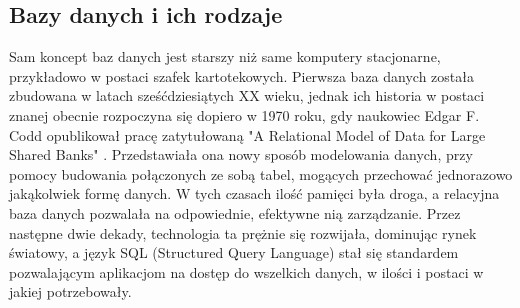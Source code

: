 \documentclass[12pt, a4paper]{article}
\begin{document}
\begin{sloppypar}
{  \subsection{Bazy danych i ich rodzaje}
  {
    Sam koncept baz danych jest starszy niż same komputery stacjonarne, przykładowo w
    postaci szafek kartotekowych. Pierwsza baza danych została zbudowana w latach
    sześćdziesiątych XX wieku,
    jednak ich historia w postaci znanej obecnie rozpoczyna się dopiero w 1970 roku,
    gdy naukowiec Edgar F. Codd opublikował pracę zatytułowaną "A Relational Model of
    Data for Large Shared Banks" \cite{rel-data}. Przedstawiała ona nowy sposób modelowania
    danych, przy pomocy budowania połączonych ze sobą tabel, mogących przechować jednorazowo
    jakąkolwiek formę danych. W tych czasach ilość pamięci była droga, a relacyjna baza
    danych pozwalała na odpowiednie, efektywne nią zarządzanie. Przez następne dwie
    dekady, technologia ta prężnie się rozwijała, dominując rynek światowy, a język
    SQL (Structured Query Language) stał się standardem pozwalającym aplikacjom na
    dostęp do wszelkich danych, w ilości i postaci w jakiej potrzebowały.

}}
\end{sloppypar}
\end{document}
